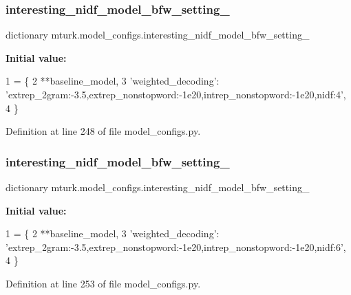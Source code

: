 \subsubsection{\texorpdfstring{interesting\+\_\+nidf\+\_\+model\+\_\+bfw\+\_\+setting\+\_}{interesting\_nidf\_model\_bfw\_setting\_04}}
{\footnotesize\ttfamily dictionary mturk.\+model\+\_\+configs.\+interesting\+\_\+nidf\+\_\+model\+\_\+bfw\+\_\+setting\+\_}

{\bfseries Initial value\+:}
\begin{DoxyCode}
1 =  \{
2     **baseline\_model,
3     \textcolor{stringliteral}{'weighted\_decoding'}: \textcolor{stringliteral}{'extrep\_2gram:-3.5,extrep\_nonstopword:-1e20,intrep\_nonstopword:-1e20,nidf:4'},
4 \}
\end{DoxyCode}


Definition at line 248 of file model\+\_\+configs.\+py.

\mbox{\label{namespacemturk_1_1model__configs_abf41a8a317edc6c160bee0cbe1cd16dd}} 
\subsubsection{\texorpdfstring{interesting\+\_\+nidf\+\_\+model\+\_\+bfw\+\_\+setting\+\_}{interesting\_nidf\_model\_bfw\_setting\_06}}
{\footnotesize\ttfamily dictionary mturk.\+model\+\_\+configs.\+interesting\+\_\+nidf\+\_\+model\+\_\+bfw\+\_\+setting\+\_}

{\bfseries Initial value\+:}
\begin{DoxyCode}
1 =  \{
2     **baseline\_model,
3     \textcolor{stringliteral}{'weighted\_decoding'}: \textcolor{stringliteral}{'extrep\_2gram:-3.5,extrep\_nonstopword:-1e20,intrep\_nonstopword:-1e20,nidf:6'},
4 \}
\end{DoxyCode}


Definition at line 253 of file model\+\_\+configs.\+py.

\mbox{\label{namespacemturk_1_1model__configs_a41f24e3164eb9a079e563da8b0396348}} 
